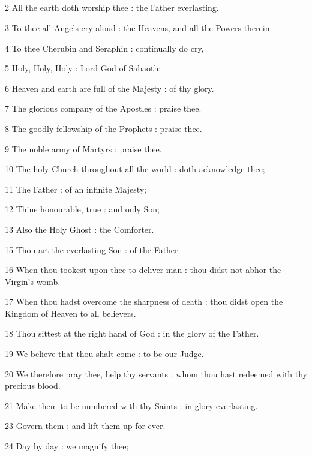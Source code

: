 \subsection{}

2 All the earth doth worship thee : the Father everlasting.

3 To thee all Angels cry aloud : the Heavens, and all the Powers therein.

4 To thee Cherubin and Seraphin : continually do cry,

5 Holy, Holy, Holy : Lord God of Sabaoth;

6 Heaven and earth are full of the Majesty : of thy glory.

7 The glorious company of the Apostles : praise thee.

8 The goodly fellowship of the Prophets : praise thee.

9 The noble army of Martyrs : praise thee.

10 The holy Church throughout all the world : doth acknowledge thee;

11 The Father : of an infinite Majesty;

12 Thine honourable, true : and only Son;

13 Also the Holy Ghost : the Comforter.


15 Thou art the everlasting Son : of the Father.

16 When thou tookest upon thee to deliver man : thou didst not abhor the Virgin's womb.

17 When thou hadst overcome the sharpness of death : thou didst open the Kingdom of Heaven to all believers.

18 Thou sittest at the right hand of God : in the glory of the Father.

19 We believe that thou shalt come : to be our Judge.

20 We therefore pray thee, help thy servants : whom thou hast redeemed with thy precious blood.

21 Make them to be numbered with thy Saints : in glory everlasting.


23 Govern them : and lift them up for ever.

24 Day by day : we magnify thee;

